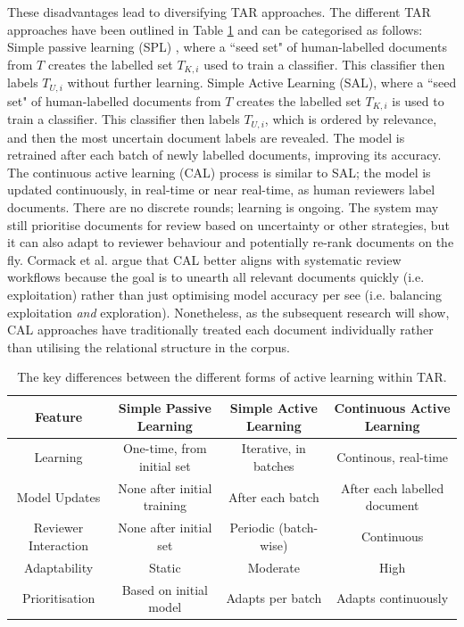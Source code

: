 \documentclass[10pt, english]{article}
\begin{document}
These disadvantages lead to diversifying TAR approaches. The different TAR approaches have been outlined in Table \ref{tab:differences_in_tar} and can be categorised as follows: Simple passive learning (SPL) \cite{cohen_reducing_2006}, where a ``seed set" of human-labelled documents from $T$ creates the labelled set $T_{K,i}$ used to train a classifier. This classifier then labels $T_{U, i}$ without further learning. Simple Active Learning (SAL), where a ``seed set" of human-labelled documents from $T$ creates the labelled set $T_{K,i}$ is used to train a classifier. This classifier then labels $T_{U, i}$, which is ordered by relevance, and then the most uncertain document labels are revealed. The model is retrained after each batch of newly labelled documents, improving its accuracy. The continuous active learning (CAL) process is similar to SAL; the model is updated continuously, in real-time or near real-time, as human reviewers label documents. There are no discrete rounds; learning is ongoing. The system may still prioritise documents for review based on uncertainty or other strategies, but it can also adapt to reviewer behaviour and potentially re-rank documents on the fly. Cormack et al. \cite{cormack_autonomy_2015} argue that CAL better aligns with systematic review workflows because the goal is to unearth all relevant documents quickly (i.e. exploitation) rather than just optimising model accuracy per see (i.e. balancing exploitation \emph{and} exploration). Nonetheless, as the subsequent research will show, CAL approaches have traditionally treated each document individually rather than utilising the relational structure in the corpus.


\begin{table}[t]

    \centering
    \footnotesize
    \begin{tabular}{|c|c|c|c|}
        \hline
        \textbf{Feature} & \textbf{Simple Passive Learning} & \textbf{Simple Active Learning} & \textbf{Continuous Active Learning} \\
        \hline
        Learning & One-time, from initial set  & Iterative, in batches  & Continous, real-time \\
        \hline
        Model Updates & None after initial training & After each batch & After each labelled document \\
        \hline
        Reviewer Interaction & None after initial set & Periodic (batch-wise) & Continuous \\
        \hline
        Adaptability & Static  & Moderate & High \\
        \hline
        Prioritisation & Based on initial model & Adapts per batch & Adapts continuously \\
        \hline
    \end{tabular}
    \caption{The key differences between the different forms of active learning within TAR.}
    \label{tab:differences_in_tar}
\end{table}
\end{document}
